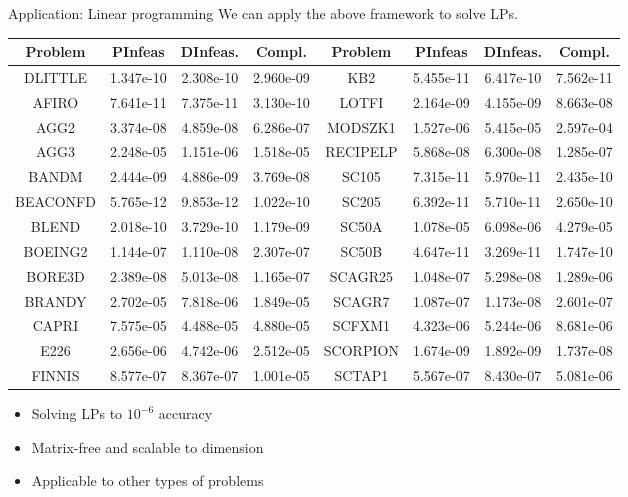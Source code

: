 \documentclass{beamer}
\numberwithin{equation}{section}
\begin{document}
\begin{frame}{Application: Linear programming}
\small
We can apply the above framework to solve LPs.
\begin{tiny}
\begin{table}[h]
  {\tiny{\begin{tabular}{cccc|c|ccc}
    \hline
    Problem & PInfeas & DInfeas. & Compl. & Problem & PInfeas & DInfeas. &
    Compl.\\
    \hline
    DLITTLE & 1.347e-10 & 2.308e-10 & 2.960e-09 & KB2 & 5.455e-11 & 6.417e-10
    & 7.562e-11\\
    \hline
    AFIRO & 7.641e-11 & 7.375e-11 & 3.130e-10 & LOTFI & 2.164e-09 & 4.155e-09
    & 8.663e-08\\
    \hline
    AGG2 & 3.374e-08 & 4.859e-08 & 6.286e-07 & MODSZK1 & 1.527e-06 & 5.415e-05
    & 2.597e-04\\
    \hline
    AGG3 & 2.248e-05 & 1.151e-06 & 1.518e-05 & RECIPELP & 5.868e-08 &
    6.300e-08 & 1.285e-07\\
    \hline
    BANDM & 2.444e-09 & 4.886e-09 & 3.769e-08 & SC105 & 7.315e-11 & 5.970e-11
    & 2.435e-10\\
    \hline
    BEACONFD & 5.765e-12 & 9.853e-12 & 1.022e-10 & SC205 & 6.392e-11 &
    5.710e-11 & 2.650e-10\\
    \hline
    BLEND & 2.018e-10 & 3.729e-10 & 1.179e-09 & SC50A & 1.078e-05 & 6.098e-06
    & 4.279e-05\\
    \hline
    BOEING2 & 1.144e-07 & 1.110e-08 & 2.307e-07 & SC50B & 4.647e-11 &
    3.269e-11 & 1.747e-10\\
    \hline
    BORE3D & 2.389e-08 & 5.013e-08 & 1.165e-07 & SCAGR25 & 1.048e-07 &
    5.298e-08 & 1.289e-06\\
    \hline
    BRANDY & 2.702e-05 & 7.818e-06 & 1.849e-05 & SCAGR7 & 1.087e-07 &
    1.173e-08 & 2.601e-07\\
    \hline
    CAPRI & 7.575e-05 & 4.488e-05 & 4.880e-05 & SCFXM1 & 4.323e-06 & 5.244e-06
    & 8.681e-06\\
    \hline
    E226 & 2.656e-06 & 4.742e-06 & 2.512e-05 & SCORPION & 1.674e-09 &
    1.892e-09 & 1.737e-08\\
    \hline
    FINNIS & 8.577e-07 & 8.367e-07 & 1.001e-05 & SCTAP1 & 5.567e-07 &
    8.430e-07 & 5.081e-06\\
    \hline
  \end{tabular}}}
\end{table}
\end{tiny}

\begin{itemize}
	\item Solving LPs to $10^{-6}$ accuracy
	\item Matrix-free and scalable to dimension
	\item Applicable to other types of problems	
\end{itemize}
\end{frame}
\end{document}
